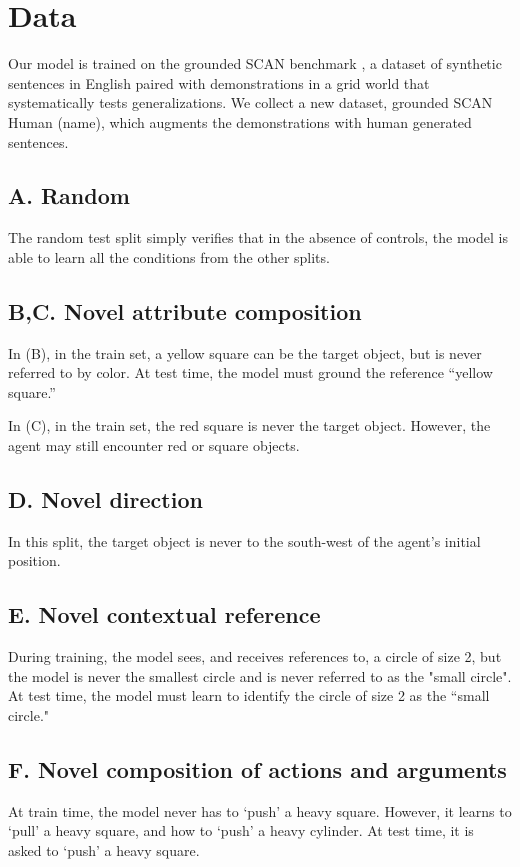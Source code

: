 \documentclass[11pt]{article}
\begin{document}
\section{Data}
Our model is trained on the grounded SCAN benchmark \citep{ruis2020benchmark}, a dataset of synthetic sentences in English paired with demonstrations in a grid world that systematically tests generalizations.
%
We collect a new dataset, grounded SCAN Human (\TODO name), which augments the demonstrations with human generated sentences.
%

\subsection*{A. Random}
The random test split simply verifies that in the absence of controls, the model is able to learn all the conditions from the other splits. 

\subsection*{B,C. Novel attribute composition}
In (B), in the train set, a yellow square can be the target object, but is never referred to by color. 
%
At test time, the model must ground the reference ``yellow square.''

In (C), in the train set, the red square is never the target object.
%
However, the agent may still encounter red or square objects.

\subsection*{D. Novel direction}
In this split, the target object is never to the south-west of the agent's initial position.

\subsection*{E. Novel contextual reference}
During training, the model sees, and receives references to, a circle of size 2, but the model is never the smallest circle and is never referred to as the "small circle".
%
At test time, the model must learn to identify the circle of size 2 as the ``small circle."

\subsection*{F. Novel composition of actions and arguments}
At train time, the model never has to `push' a heavy square.
%
However, it learns to `pull' a heavy square, and how to `push' a heavy cylinder.
%
At test time, it is asked to `push' a heavy square.
\end{document}
